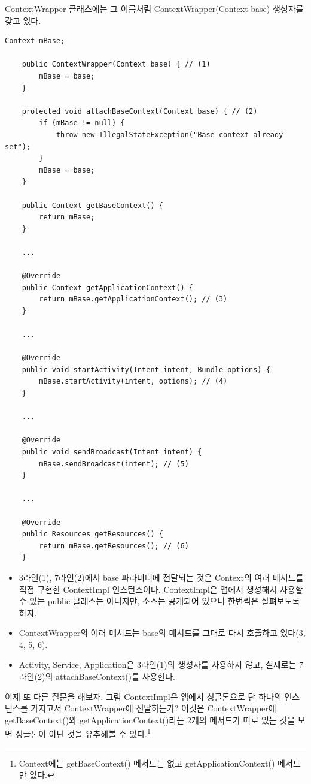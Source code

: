 ContextWrapper 클래스에는 그 이름처럼 ContextWrapper(Context base) 생성자를 갖고 있다.
\begin{lstlisting}[frame=single, caption=ContextWrapper.java]
    Context mBase;

    public ContextWrapper(Context base) { // (1)
        mBase = base;
    }

	protected void attachBaseContext(Context base) { // (2)
        if (mBase != null) {
            throw new IllegalStateException("Base context already set");
        }
        mBase = base;
    }
    
    public Context getBaseContext() {
        return mBase;
    }
    
    ...
    
    @Override
    public Context getApplicationContext() {
        return mBase.getApplicationContext(); // (3)
    }
    
    ...
    
    @Override
    public void startActivity(Intent intent, Bundle options) {
        mBase.startActivity(intent, options); // (4)
    }
    
    ...
    
    @Override
    public void sendBroadcast(Intent intent) {
        mBase.sendBroadcast(intent); // (5)
    }

	... 
	
    @Override
    public Resources getResources() {
        return mBase.getResources(); // (6)
    }
\end{lstlisting}
\begin{itemize}
\item 3라인(1), 7라인(2)에서 base 파라미터에 전달되는 것은 Context의 여러 메서드를 직접 구현한 ContextImpl 인스턴스이다. 
ContextImpl은 앱에서 생성해서 사용할 수 있는 public 클래스는 아니지만, 소스는 공개되어 있으니 한번씩은 살펴보도록 하자.

\item ContextWrapper의 여러 메서드는 base의 메서드를 그대로 다시 호출하고 있다(3, 4, 5, 6).

\item Activity, Service, Application은 3라인(1)의 생성자를 사용하지 않고, 실제로는 7라인(2)의 attachBaseContext()를 사용한다. 
\end{itemize}

이제 또 다른 질문을 해보자. 그럼 ContextImpl은 앱에서 싱글톤으로 단 하나의 인스턴스를 가지고서 ContextWrapper에 전달하는가?
이것은 ContextWrapper에 getBaseContext()와 getApplicationContext()라는 2개의 메서드가 따로 있는 것을 보면 싱글톤이 아닌 것을 유추해볼 수 있다.\footnote{Context에는 getBaseContext() 메서드는 없고 getApplicationContext() 메서드만 있다.}\\

